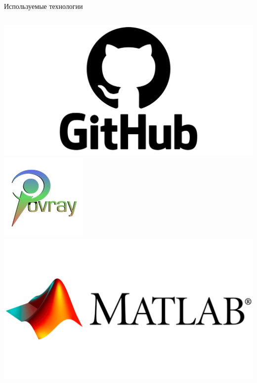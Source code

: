 \documentclass{beamer} %
\begin{document}
\begin{frame}{Используемые технологии}
\begin{columns}
    \begin{column}{0.3\linewidth}
      \begin{center}
        \includegraphics[width=\textwidth]{github_logo.png}
        \includegraphics[width=\textwidth]{povray_logo.png}
        \includegraphics[width=\textwidth]{matlab_logo.png}
      \end{center}
    \end{column}


\end{columns}
\end{frame}
\end{document}
